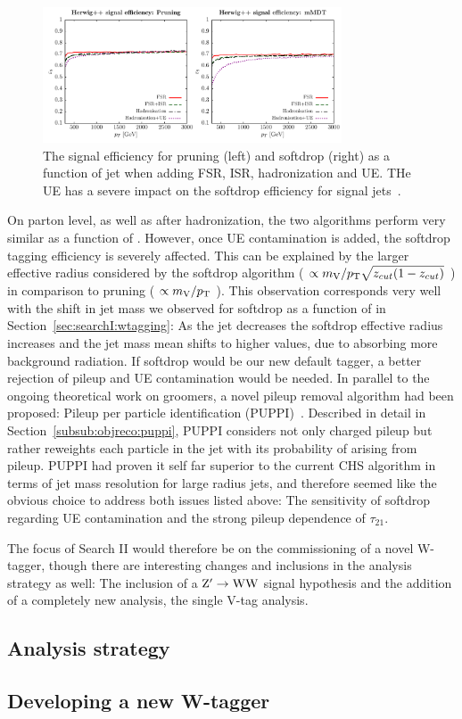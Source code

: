 \begin{figure}[h!]
\centering
\includegraphics[width=0.79\textwidth]{figures/analysis/search2/misc/pruningvssd_ue.pdf}
\caption{The signal efficiency for pruning (left) and softdrop (right) as a function of jet \PT when adding FSR, ISR, hadronization and UE. THe UE has a severe impact on the softdrop efficiency for signal jets~\cite{Dasgupta:2015yua}. }
\label{fig:searchII:ue}
\end{figure}

On parton level, as well as after hadronization, the two algorithms perform very similar as a function of \PT. However, once UE contamination is added, the softdrop tagging efficiency is severely affected. This can be explained by the larger effective radius considered by the softdrop algorithm ( $\propto m_{\mathrm{V}}/p_{\mathrm{T}} \sqrt{z_{cut}(1-z_{cut})}$ ) in comparison to pruning ( $\propto m_{\mathrm{V}}/p_{\mathrm{T}}$ ). This observation corresponds very well with the shift in jet mass we observed for softdrop as a function of \PT in Section~\ref{sec:searchI:wtagging}: As the jet \PT decreases the softdrop effective radius increases and the jet mass mean shifts to higher values, due to absorbing more background radiation. If softdrop would be our new default tagger, a better rejection of pileup and UE contamination would be needed.
\bigskip
In parallel to the ongoing theoretical work on groomers, a novel pileup removal algorithm had been proposed: Pileup per particle identification (PUPPI)~\cite{Bertolini2014}. Described in detail in Section~\ref{subsub:objreco:puppi}, PUPPI considers not only charged pileup but rather reweights each particle in the jet with its probability of arising from pileup. PUPPI had proven it self far superior to the current CHS algorithm in terms of jet mass resolution for large radius jets, and therefore seemed like the obvious choice to address both issues listed above: The sensitivity of softdrop regarding UE contamination and the strong pileup dependence of $\tau_{21}$.\par
The focus of Search II would therefore be on the commissioning of a novel W-tagger, though there are interesting changes and inclusions in the analysis strategy as well:\newline
The inclusion of a $\mathrm{Z}^\prime \rightarrow \mathrm{W}\mathrm{W}$ signal hypothesis and the addition of a completely new analysis, the single V-tag analysis.

\subsection{Analysis strategy}

\subsection{Developing a new W-tagger}
\label{sec:searchII:puppisoftdrop}